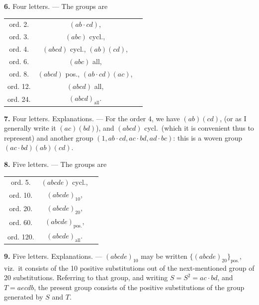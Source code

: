 \documentclass[11pt,a4paper]{article}
\begin{document}
\vspace{0.5em}
\textbf{6.} Four letters. --- The groups are
\begin{center}
\begin{tabular}{ccl}
ord.  2. & $(ab \cdot cd)$, \\
ord.  3. & $(abc)$ cycl., \\
ord.  4. & $(abcd)$ cycl., $(ab)(cd)$, \\
ord.  6. & $(abc)$ all, \\
ord.  8. & $(abcd)$ pos., $(ab \cdot cd)(ac)$, \\
ord. 12. & $(abcd)$ all, \\
ord. 24. & $(abcd)_{\text{all}}$.
\end{tabular}
\end{center}

\vspace{0.5em}
\textbf{7.} Four letters. Explanations. --- For the order 4, we have $(ab)(cd)$, (or as I generally write it $(ac)(bd)$), and $(abcd)$ cycl.\ (which it is convenient thus to represent) and another group $(1, ab \cdot cd, ac \cdot bd, ad \cdot bc)$: this is a woven group $(ac \cdot bd)(ab)(cd)$.

\vspace{0.5em}
\textbf{8.} Five letters. --- The groups are
\begin{center}
\begin{tabular}{ccl}
ord.  5. & $(abcde)$ cycl., \\
ord. 10. & $(abcde)_{10}$, \\
ord. 20. & $(abcde)_{20}$, \\
ord. 60. & $(abcde)_{\text{pos.}}$, \\
ord. 120. & $(abcde)_{\text{all}}$.
\end{tabular}
\end{center}

\vspace{0.5em}
\textbf{9.} Five letters. Explanations. --- $(abcde)_{10}$ may be written $\{(abcde)_{20}\}_{\text{pos.}}$, viz.\ it consists of the 10 positive substitutions out of the next-mentioned group of 20 substitutions. Referring to that group, and writing $S = S^2 = ac \cdot bd$, and $T = aecdb$, the present group consists of the positive substitutions of the group generated by $S$ and $T$.
\end{document}
